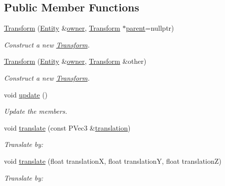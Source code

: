 \subsection*{Public Member Functions}
\begin{DoxyCompactItemize}
\item 
\mbox{\hyperlink{classprz_1_1_transform_a3728e8216215bccfd7585d364c2b2edd}{Transform}} (\mbox{\hyperlink{classprz_1_1_entity}{Entity}} \&\mbox{\hyperlink{classprz_1_1_transform_a16403133940713f900fcc5b66300a10b}{owner}}, \mbox{\hyperlink{classprz_1_1_transform}{Transform}} $\ast$\mbox{\hyperlink{classprz_1_1_transform_a9acc3ca9bcab25fba6ab51727c240432}{parent}}=nullptr)
\begin{DoxyCompactList}\small\item\em Construct a new \mbox{\hyperlink{classprz_1_1_transform}{Transform}}. \end{DoxyCompactList}\item 
\mbox{\hyperlink{classprz_1_1_transform_af3a80de091cf1fb9871b735746be6714}{Transform}} (\mbox{\hyperlink{classprz_1_1_entity}{Entity}} \&\mbox{\hyperlink{classprz_1_1_transform_a16403133940713f900fcc5b66300a10b}{owner}}, \mbox{\hyperlink{classprz_1_1_transform}{Transform}} \&other)
\begin{DoxyCompactList}\small\item\em Construct a new \mbox{\hyperlink{classprz_1_1_transform}{Transform}}. \end{DoxyCompactList}\item 
void \mbox{\hyperlink{classprz_1_1_transform_af49227fa642fc433c6d1344dc0eebc18}{update}} ()
\begin{DoxyCompactList}\small\item\em Update the members. \end{DoxyCompactList}\item 
void \mbox{\hyperlink{classprz_1_1_transform_afb3676728f23569e5589adadcb4ae3d3}{translate}} (const P\+Vec3 \&\mbox{\hyperlink{classprz_1_1_transform_ab23448e27c3d383e9e494c1518058ee8}{translation}})
\begin{DoxyCompactList}\small\item\em Translate by\+: \end{DoxyCompactList}\item 
void \mbox{\hyperlink{classprz_1_1_transform_ad90f3df96f31284ebec55fcbbb61e8be}{translate}} (float translationX, float translationY, float translationZ)
\begin{DoxyCompactList}\small\item\em Translate by\+: \end{DoxyCompactList}\item 

\end{DoxyCompactItemize}
